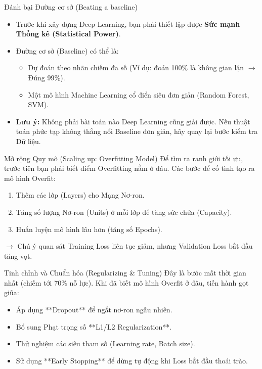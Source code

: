 \documentclass[aspectratio=169]{beamer}
\begin{document}
\begin{frame}{Đánh bại Đường cơ sở (Beating a baseline)}
    \begin{itemize}
        \item Trước khi xây dựng Deep Learning, bạn phải thiết lập được \textbf{Sức mạnh Thống kê (Statistical Power)}.
        \item Đường cơ sở (Baseline) có thể là:
        \begin{itemize}
            \item Dự đoán theo nhãn chiếm đa số (Ví dụ: đoán 100\% là không gian lận $\rightarrow$ Đúng 99\%).
            \item Một mô hình Machine Learning cổ điển siêu đơn giản (Random Forest, SVM).
        \end{itemize}
        \item \textbf{Lưu ý:} Không phải bài toán nào Deep Learning cũng giải được. Nếu thuật toán phức tạp không thắng nổi Baseline đơn giản, hãy quay lại bước kiểm tra Dữ liệu.
    \end{itemize}
\end{frame}

\begin{frame}{Mở rộng Quy mô (Scaling up: Overfitting Model)}
    Để tìm ra ranh giới tối ưu, trước tiên bạn phải biết điểm Overfitting nằm ở đâu. Các bước để cố tình tạo ra mô hình Overfit:
    \begin{enumerate}
        \item Thêm các lớp (Layers) cho Mạng Nơ-ron.
        \item Tăng số lượng Nơ-ron (Units) ở mỗi lớp để tăng sức chứa (Capacity).
        \item Huấn luyện mô hình lâu hơn (tăng số Epochs).
    \end{enumerate}
    $\rightarrow$ Chú ý quan sát Training Loss liên tục giảm, nhưng Validation Loss bắt đầu tăng vọt.
\end{frame}

\begin{frame}{Tinh chỉnh và Chuẩn hóa (Regularizing \& Tuning)}
    Đây là bước mất thời gian nhất (chiếm tới 70\% nỗ lực). Khi đã biết mô hình Overfit ở đâu, tiến hành gọt giũa:
    \begin{itemize}
        \item Áp dụng **Dropout** để ngắt nơ-ron ngẫu nhiên.
        \item Bổ sung Phạt trọng số **L1/L2 Regularization**.
        \item Thử nghiệm các siêu tham số (Learning rate, Batch size).
        \item Sử dụng **Early Stopping** để dừng tự động khi Loss bắt đầu thoái trào.
    \end{itemize}
\end{frame}
\end{document}
